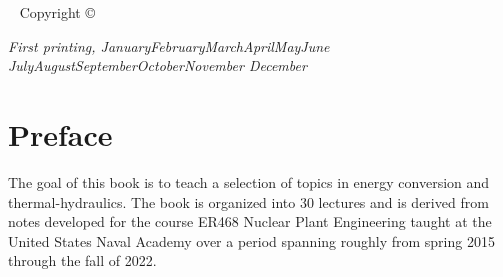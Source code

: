 \documentclass{tufte-book}
\newcommand{\monthyear}{%
  \ifcase\month\or January\or February\or March\or April\or May\or June\or
  July\or August\or September\or October\or November\or
  December\fi\space\number\year
}
\begin{document}
\maketitle


\newpage
\begin{fullwidth}
~\vfill
\thispagestyle{empty}
\setlength{\parindent}{0pt}
\setlength{\parskip}{\baselineskip}
Copyright \copyright\ \the\year\ \thanklessauthor

\par{}

%

\par\textit{First printing, \monthyear}
\end{fullwidth}

\tableofcontents

\listoffigures

\listoftables



\cleardoublepage
\chapter*{Preface}

The goal of this book is to teach a selection of topics in energy conversion and thermal-hydraulics.  The book is organized into 30 lectures and is derived from notes developed for the course ER468 Nuclear Plant Engineering taught at the United States Naval Academy over a period spanning roughly from spring 2015 through the fall of 2022.
\end{document}

